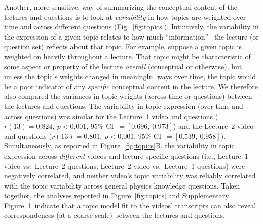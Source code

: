 \documentclass[10pt]{article}
\newcommand{\topicWeights}{1}
\begin{document}
Another, more sensitive, way of summarizing the conceptual content of the
lectures and questions is to look at \textit{variability} in how topics are
weighted over time and across different questions (Fig.~\ref{fig:topics}).
Intuitively, the variability in the expression of a given topic relates to how
much ``information''~\citep{Fish22} the lecture (or question set) reflects about
that topic. For example, suppose a given topic is weighted on heavily
throughout a lecture. That topic might be characteristic of some aspect or
property of the lecture \textit{overall} (conceptual or otherwise), but unless
the topic's weights changed in meaningful ways over time, the topic would be a
poor indicator of any \textit{specific} conceptual content in the lecture. We
therefore also compared the variances in topic weights (across time or
questions) between the lectures and questions. The variability in topic
expression (over time and across questions) was similar for the Lecture~1 video
and questions ($r(13) = 0.824,~p<0.001$, 95\% CI~$= [0.696,~0.973]$) and the Lecture~2
video and questions ($r(13) = 0.801,~p<0.001$, 95\% CI~$= [0.539,~0.958]$).
Simultaneously, as reported in Figure~\ref{fig:topics}B, the variability in
topic expression across \textit{different} videos and lecture-specific
questions (i.e., Lecture~1 video vs.~Lecture~2 questions; Lecture~2 video
vs.~Lecture~1 questions) were negatively correlated, and neither
video's topic variability was reliably correlated with the topic variability
across general physics knowledge questions. Taken together, the analyses
reported in Figure~\ref{fig:topics} and Supplementary Figure~\topicWeights~indicate that a topic
model fit to the videos' transcripts can also reveal correspondences (at a
coarse scale) between the lectures and questions.
\end{document}
